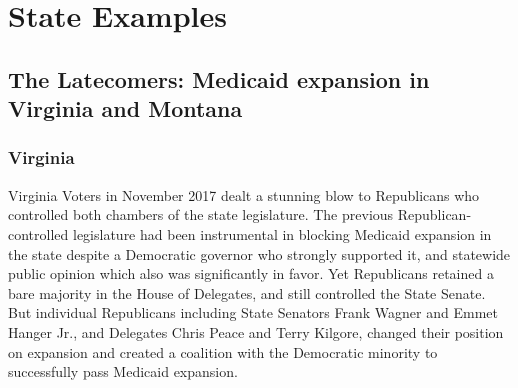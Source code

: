 \documentclass[
  oneside]{book}
\begin{document}
\hypertarget{state-examples}{%
\section{State Examples}\label{state-examples}}

\hypertarget{the-latecomers-medicaid-expansion-in-virginia-and-montana}{%
\subsection{The Latecomers: Medicaid expansion in Virginia and Montana}\label{the-latecomers-medicaid-expansion-in-virginia-and-montana}}

\hypertarget{virginia}{%
\subsubsection{Virginia}\label{virginia}}

Virginia Voters in November 2017 dealt a stunning blow to Republicans who controlled both chambers of the state legislature. The previous Republican-controlled legislature had been instrumental in blocking Medicaid expansion in the state despite a Democratic governor who strongly supported it, and statewide public opinion which also was significantly in favor. Yet Republicans retained a bare majority in the House of Delegates, and still controlled the State Senate. But individual Republicans including State Senators Frank Wagner and Emmet Hanger Jr., and Delegates Chris Peace and Terry Kilgore, changed their position on expansion and created a coalition with the Democratic minority to successfully pass Medicaid expansion.
\end{document}
